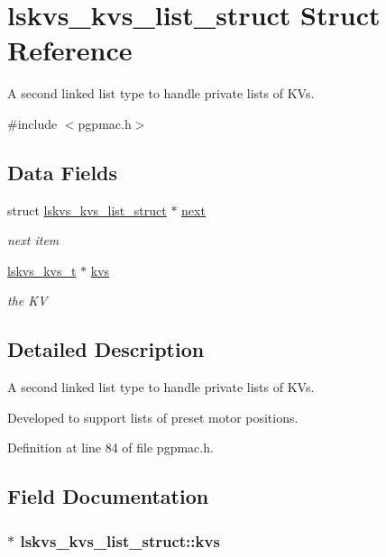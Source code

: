 \hypertarget{structlskvs__kvs__list__struct}{\section{lskvs\-\_\-kvs\-\_\-list\-\_\-struct Struct Reference}
\label{structlskvs__kvs__list__struct}
}


A second linked list type to handle private lists of K\-Vs.  




{\ttfamily \#include $<$pgpmac.\-h$>$}

\subsection*{Data Fields}
\begin{DoxyCompactItemize}
\item 
struct \hyperlink{structlskvs__kvs__list__struct}{lskvs\-\_\-kvs\-\_\-list\-\_\-struct} $\ast$ \hyperlink{structlskvs__kvs__list__struct_aa3ed4d35bdda99bb1c08793633579edc}{next}
\begin{DoxyCompactList}\small\item\em next item \end{DoxyCompactList}\item 
\hyperlink{pgpmac_8h_a54bd386f945edb8a0311a20199e8f793}{lskvs\-\_\-kvs\-\_\-t} $\ast$ \hyperlink{structlskvs__kvs__list__struct_a7f5620fa24157783bb02e6dd82bdcb22}{kvs}
\begin{DoxyCompactList}\small\item\em the K\-V \end{DoxyCompactList}\end{DoxyCompactItemize}


\subsection{Detailed Description}
A second linked list type to handle private lists of K\-Vs. 

Developed to support lists of preset motor positions. 

Definition at line 84 of file pgpmac.\-h.



\subsection{Field Documentation}
\hypertarget{structlskvs__kvs__list__struct_a7f5620fa24157783bb02e6dd82bdcb22}{
\subsubsection[{kvs}]{$\ast$ lskvs\-\_\-kvs\-\_\-list\-\_\-struct\-::kvs}}\label{structlskvs__kvs__list__struct_a7f5620fa24157783bb02e6dd82bdcb22}


